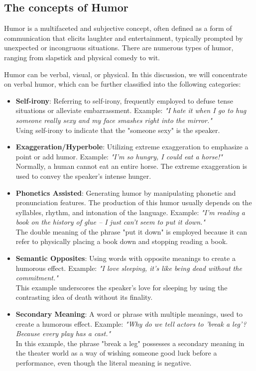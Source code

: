 \documentclass[a4paper]{article}
\begin{document}
\subsection{The concepts of Humor}

Humor is a multifaceted and subjective concept, often defined as a form of communication that elicits laughter and entertainment, typically prompted by unexpected or incongruous situations. There are numerous types of humor, ranging from slapstick and physical comedy to wit.

Humor can be verbal, visual, or physical. In this discussion, we will concentrate on verbal humor, which can be further classified into the following categories:

\begin{itemize}
\item {\bf Self-irony}: Referring to self-irony, frequently employed to defuse tense situations or alleviate embarrassment. Example:
\subitem\textit{"I hate it when I go to hug someone really sexy and my face smashes right into the mirror."}
\\Using self-irony to indicate that the "someone sexy" is the speaker.
\item {\bf Exaggeration/Hyperbole}: Utilizing extreme exaggeration to emphasize a point or add humor. Example:
\subitem\textit{"I'm so hungry, I could eat a horse!"}
\\Normally, a human cannot eat an entire horse. The extreme exaggeration is used to convey the speaker's intense hunger.
\item {\bf Phonetics Assisted}: Generating humor by manipulating phonetic and pronunciation features. The production of this humor usually depends on the syllables, rhythm, and intonation of the language. Example:
\subitem\textit{"I'm reading a book on the history of glue – I just can't seem to put it down."}
\\The double meaning of the phrase "put it down" is employed because it can refer to physically placing a book down and stopping reading a book.
\item {\bf Semantic Opposites}: Using words with opposite meanings to create a humorous effect. Example:
\subitem\textit{"I love sleeping, it's like being dead without the commitment."}
\\This example underscores the speaker's love for sleeping by using the contrasting idea of death without its finality.
\item {\bf Secondary Meaning}: A word or phrase with multiple meanings, used to create a humorous effect. Example:
\subitem\textit{"Why do we tell actors to 'break a leg'? Because every play has a cast."}
\\In this example, the phrase "break a leg" possesses a secondary meaning in the theater world as a way of wishing someone good luck before a performance, even though the literal meaning is negative.
\end{itemize}
\end{document}
